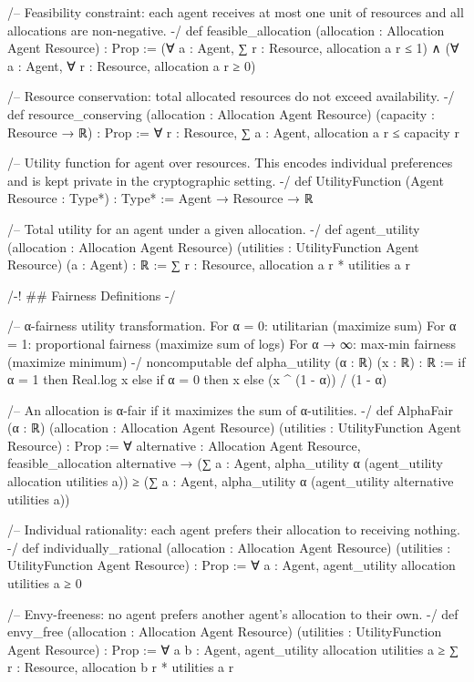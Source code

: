 /--
Feasibility constraint: each agent receives at most one unit of resources
and all allocations are non-negative.
-/
def feasible_allocation (allocation : Allocation Agent Resource) : Prop :=
  (∀ a : Agent, ∑ r : Resource, allocation a r ≤ 1) ∧
  (∀ a : Agent, ∀ r : Resource, allocation a r ≥ 0)

/--
Resource conservation: total allocated resources do not exceed availability.
-/
def resource_conserving (allocation : Allocation Agent Resource) 
    (capacity : Resource → ℝ) : Prop :=
  ∀ r : Resource, ∑ a : Agent, allocation a r ≤ capacity r

/--
Utility function for agent over resources.
This encodes individual preferences and is kept private in the cryptographic setting.
-/
def UtilityFunction (Agent Resource : Type*) : Type* := Agent → Resource → ℝ

/--
Total utility for an agent under a given allocation.
-/
def agent_utility (allocation : Allocation Agent Resource) 
    (utilities : UtilityFunction Agent Resource) (a : Agent) : ℝ :=
  ∑ r : Resource, allocation a r * utilities a r

/-! ## Fairness Definitions -/

/--
α-fairness utility transformation.
For α = 0: utilitarian (maximize sum)
For α = 1: proportional fairness (maximize sum of logs)  
For α → ∞: max-min fairness (maximize minimum)
-/
noncomputable def alpha_utility (α : ℝ) (x : ℝ) : ℝ :=
  if α = 1 then 
    Real.log x
  else if α = 0 then 
    x
  else 
    (x ^ (1 - α)) / (1 - α)

/--
An allocation is α-fair if it maximizes the sum of α-utilities.
-/
def AlphaFair (α : ℝ) (allocation : Allocation Agent Resource) 
    (utilities : UtilityFunction Agent Resource) : Prop :=
  ∀ alternative : Allocation Agent Resource,
    feasible_allocation alternative →
    (∑ a : Agent, alpha_utility α (agent_utility allocation utilities a)) ≥
    (∑ a : Agent, alpha_utility α (agent_utility alternative utilities a))

/--
Individual rationality: each agent prefers their allocation to receiving nothing.
-/
def individually_rational (allocation : Allocation Agent Resource)
    (utilities : UtilityFunction Agent Resource) : Prop :=
  ∀ a : Agent, agent_utility allocation utilities a ≥ 0

/--
Envy-freeness: no agent prefers another agent's allocation to their own.
-/
def envy_free (allocation : Allocation Agent Resource)
    (utilities : UtilityFunction Agent Resource) : Prop :=
  ∀ a b : Agent, 
    agent_utility allocation utilities a ≥ 
    ∑ r : Resource, allocation b r * utilities a r


